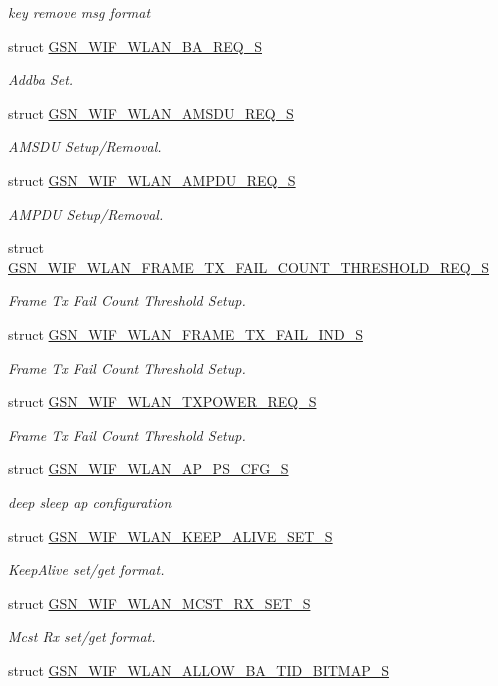 \begin{DoxyCompactItemize}
\begin{DoxyCompactList}\small\item\em key remove msg format \end{DoxyCompactList}\item 
struct \hyperlink{a00370}{GSN\_\-WIF\_\-WLAN\_\-BA\_\-REQ\_\-S}
\begin{DoxyCompactList}\small\item\em Addba Set. \end{DoxyCompactList}\item 
struct \hyperlink{a00367}{GSN\_\-WIF\_\-WLAN\_\-AMSDU\_\-REQ\_\-S}
\begin{DoxyCompactList}\small\item\em AMSDU Setup/Removal. \end{DoxyCompactList}\item 
struct \hyperlink{a00366}{GSN\_\-WIF\_\-WLAN\_\-AMPDU\_\-REQ\_\-S}
\begin{DoxyCompactList}\small\item\em AMPDU Setup/Removal. \end{DoxyCompactList}\item 
struct \hyperlink{a00381}{GSN\_\-WIF\_\-WLAN\_\-FRAME\_\-TX\_\-FAIL\_\-COUNT\_\-THRESHOLD\_\-REQ\_\-S}
\begin{DoxyCompactList}\small\item\em Frame Tx Fail Count Threshold Setup. \end{DoxyCompactList}\item 
struct \hyperlink{a00382}{GSN\_\-WIF\_\-WLAN\_\-FRAME\_\-TX\_\-FAIL\_\-IND\_\-S}
\begin{DoxyCompactList}\small\item\em Frame Tx Fail Count Threshold Setup. \end{DoxyCompactList}\item 
struct \hyperlink{a00411}{GSN\_\-WIF\_\-WLAN\_\-TXPOWER\_\-REQ\_\-S}
\begin{DoxyCompactList}\small\item\em Frame Tx Fail Count Threshold Setup. \end{DoxyCompactList}\item 
struct \hyperlink{a00368}{GSN\_\-WIF\_\-WLAN\_\-AP\_\-PS\_\-CFG\_\-S}
\begin{DoxyCompactList}\small\item\em deep sleep ap configuration \end{DoxyCompactList}\item 
struct \hyperlink{a00385}{GSN\_\-WIF\_\-WLAN\_\-KEEP\_\-ALIVE\_\-SET\_\-S}
\begin{DoxyCompactList}\small\item\em KeepAlive set/get format. \end{DoxyCompactList}\item 
struct \hyperlink{a00389}{GSN\_\-WIF\_\-WLAN\_\-MCST\_\-RX\_\-SET\_\-S}
\begin{DoxyCompactList}\small\item\em Mcst Rx set/get format. \end{DoxyCompactList}\item 
struct \hyperlink{a00365}{GSN\_\-WIF\_\-WLAN\_\-ALLOW\_\-BA\_\-TID\_\-BITMAP\_\-S}
\end{DoxyCompactItemize}
